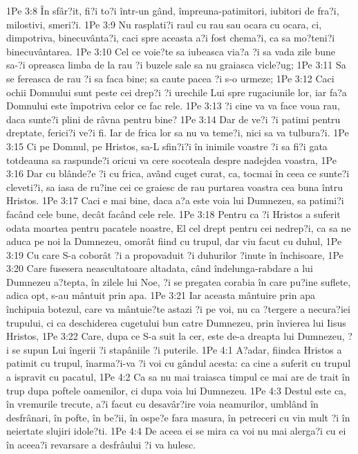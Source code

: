 1Pe 3:8  În sfâr?it, fi?i to?i într-un gând, împreuna-patimitori, iubitori de fra?i, milostivi, smeri?i.
1Pe 3:9  Nu rasplati?i raul cu rau sau ocara cu ocara, ci, dimpotriva, binecuvânta?i, caci spre aceasta a?i fost chema?i, ca sa mo?teni?i binecuvântarea.
1Pe 3:10  Cel ce voie?te sa iubeasca via?a ?i sa vada zile bune sa-?i opreasca limba de la rau ?i buzele sale sa nu graiasca vicle?ug;
1Pe 3:11  Sa se fereasca de rau ?i sa faca bine; sa caute pacea ?i s-o urmeze;
1Pe 3:12  Caci ochii Domnului sunt peste cei drep?i ?i urechile Lui spre rugaciunile lor, iar fa?a Domnului este împotriva celor ce fac rele.
1Pe 3:13  ?i cine va va face voua rau, daca sunte?i plini de râvna pentru bine?
1Pe 3:14  Dar de ve?i ?i patimi pentru dreptate, ferici?i ve?i fi. Iar de frica lor sa nu va teme?i, nici sa va tulbura?i.
1Pe 3:15  Ci pe Domnul, pe Hristos, sa-L sfin?i?i în inimile voastre ?i sa fi?i gata totdeauna sa raspunde?i oricui va cere socoteala despre nadejdea voastra,
1Pe 3:16  Dar cu blânde?e ?i cu frica, având cuget curat, ca, tocmai în ceea ce sunte?i cleveti?i, sa iasa de ru?ine cei ce graiesc de rau purtarea voastra cea buna întru Hristos.
1Pe 3:17  Caci e mai bine, daca a?a este voia lui Dumnezeu, sa patimi?i facând cele bune, decât facând cele rele.
1Pe 3:18  Pentru ca ?i Hristos a suferit odata moartea pentru pacatele noastre, El cel drept pentru cei nedrep?i, ca sa ne aduca pe noi la Dumnezeu, omorât fiind cu trupul, dar viu facut cu duhul,
1Pe 3:19  Cu care S-a coborât ?i a propovaduit ?i duhurilor ?inute în închisoare,
1Pe 3:20  Care fusesera neascultatoare altadata, când îndelunga-rabdare a lui Dumnezeu a?tepta, în zilele lui Noe, ?i se pregatea corabia în care pu?ine suflete, adica opt, s-au mântuit prin apa.
1Pe 3:21  Iar aceasta mântuire prin apa închipuia botezul, care va mântuie?te astazi ?i pe voi, nu ca ?tergere a necura?iei trupului, ci ca deschiderea cugetului bun catre Dumnezeu, prin învierea lui Iisus Hristos,
1Pe 3:22  Care, dupa ce S-a suit la cer, este de-a dreapta lui Dumnezeu, ?i se supun Lui îngerii ?i stapâniile ?i puterile.
1Pe 4:1  A?adar, fiindca Hristos a patimit cu trupul, înarma?i-va ?i voi cu gândul acesta: ca cine a suferit cu trupul a ispravit cu pacatul,
1Pe 4:2  Ca sa nu mai traiasca timpul ce mai are de trait în trup dupa poftele oamenilor, ci dupa voia lui Dumnezeu.
1Pe 4:3  Destul este ca, în vremurile trecute, a?i facut cu desavâr?ire voia neamurilor, umblând în desfrânari, în pofte, în be?ii, în ospe?e fara masura, în petreceri cu vin mult ?i în neiertate slujiri idole?ti.
1Pe 4:4  De aceea ei se mira ca voi nu mai alerga?i cu ei în aceea?i revarsare a desfrâului ?i va hulesc.
